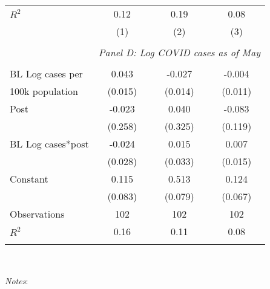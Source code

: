 \begin{table}[!htbp]
\begin{tabular}{@{\extracolsep{5pt}}lccc}
\(R^{2}\)           &        0.12         &        0.19         &        0.08         \\
                    &\multicolumn{1}{c}{(1)}         &\multicolumn{1}{c}{(2)}         &\multicolumn{1}{c}{(3)}         \\
\hline \\               & \multicolumn{3}{c}{\textit{Panel D: Log COVID cases as of May}} \\               \addlinespace[1mm] \\
BL Log cases per    &       0.043\sym{***}&      -0.027\sym{*}  &      -0.004         \\
100k population     &     (0.015)         &     (0.014)         &     (0.011)         \\
[1em]
Post                &      -0.023         &       0.040         &      -0.083         \\
                    &     (0.258)         &     (0.325)         &     (0.119)         \\
[1em]
BL Log cases*post   &      -0.024         &       0.015         &       0.007         \\
                    &     (0.028)         &     (0.033)         &     (0.015)         \\
[1em]
Constant            &       0.115         &       0.513\sym{***}&       0.124\sym{*}  \\
                    &     (0.083)         &     (0.079)         &     (0.067)         \\
[1em]
Observations        &         102         &         102         &         102         \\
\(R^{2}\)           &        0.16         &        0.11         &        0.08         \\
\hline                         \hline                          \hline \\[-1.8ex]                          \end{tabular}                         \\                         \begin{minipage}{1.0 \textwidth}                         {\footnotesize \emph{Notes}:                          \starlanguage}                         \end{minipage}                         \end{table}
